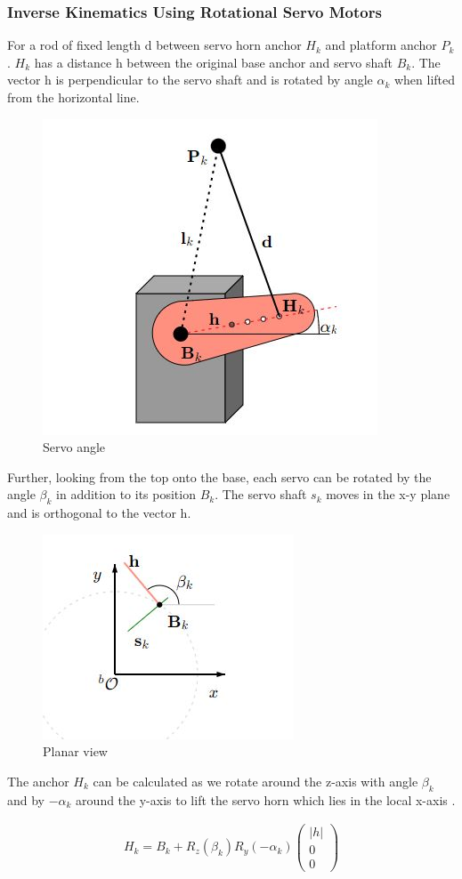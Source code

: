 \subsubsection{Inverse Kinematics Using Rotational Servo Motors}
For a rod of fixed length d between servo horn anchor $H_{k}$ and platform anchor $P_{k}$.  $H_{k}$ has a distance h between the original base anchor and servo shaft $B_{k}$. The vector h is perpendicular to the servo shaft and is rotated by angle $\alpha_{k}$ when lifted from the horizontal line.
\begin{center}
	\begin{figure}[!h]
	\centering
	\includegraphics[width=0.4\linewidth]{Figures/servo}
	\caption[Servo angle]{Servo angle \cite{Eisele_2019}}
	\end{figure}
\end{center}
Further, looking from the top onto the base, each servo can be rotated by the angle $\beta_{k}$ in addition to its position $B_{k}$. The servo shaft $s_{k}$ moves in the x-y plane and is orthogonal to the vector h.
\begin{center}
	\begin{figure}[!h]
	\centering
	\includegraphics[width=0.4\linewidth]{Figures/servo1}
	\caption[Planar view]{Planar view \cite{Eisele_2019}}
	\end{figure}
\end{center}
The anchor $H_{k}$ can be calculated as we rotate around the z-axis with angle $\beta_{k}$ and  by $-\alpha_{k}$ around the y-axis to lift the servo horn which lies in the local x-axis \cite{Eisele_2019}.
\begin{ceqn}
\begin{align}
	H_{k} = B_{k} + R_{z}(\beta_{k}) R_{y}(-\alpha_{k})\begin{pmatrix}
	|h|\\ 0 \\ 0
	\end{pmatrix}
	\label{eq:myeqn2}
\end{align}
\end{ceqn}
